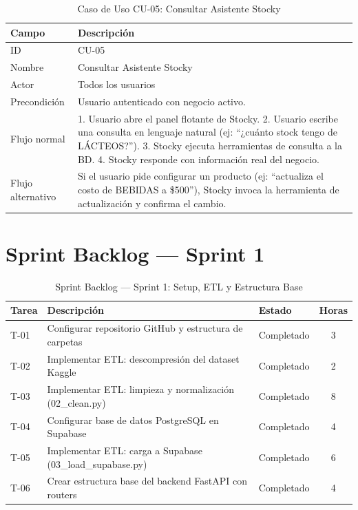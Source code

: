 \documentclass[12pt, a4paper]{report}
\begin{document}
\begin{table}[H]
  \centering
  \caption{Caso de Uso CU-05: Consultar Asistente Stocky}
  \label{tab:cu05}
  \begin{tabular}{|l|p{9cm}|}
    \hline
    \textbf{Campo} & \textbf{Descripción} \\
    \hline
    ID            & CU-05 \\
    Nombre        & Consultar Asistente Stocky \\
    Actor         & Todos los usuarios \\
    Precondición  & Usuario autenticado con negocio activo. \\
    Flujo normal  & 1. Usuario abre el panel flotante de Stocky. 2. Usuario escribe
                    una consulta en lenguaje natural (ej: ``¿cuánto stock tengo de
                    LÁCTEOS?''). 3. Stocky ejecuta herramientas de consulta a la BD.
                    4. Stocky responde con información real del negocio. \\
    Flujo alternativo & Si el usuario pide configurar un producto (ej: ``actualiza
                        el costo de BEBIDAS a \$500''), Stocky invoca la herramienta
                        de actualización y confirma el cambio. \\
    \hline
  \end{tabular}
\end{table}

\section{Sprint Backlog — Sprint 1}

\begin{table}[H]
  \centering
  \caption{Sprint Backlog — Sprint 1: Setup, ETL y Estructura Base}
  \label{tab:sprint1}
  \begin{tabular}{|l|p{6cm}|l|c|}
    \hline
    \textbf{Tarea} & \textbf{Descripción} & \textbf{Estado} & \textbf{Horas} \\
    \hline
    T-01 & Configurar repositorio GitHub y estructura de carpetas    & Completado & 3 \\
    T-02 & Implementar ETL: descompresión del dataset Kaggle         & Completado & 2 \\
    T-03 & Implementar ETL: limpieza y normalización (02\_clean.py)  & Completado & 8 \\
    T-04 & Configurar base de datos PostgreSQL en Supabase           & Completado & 4 \\
    T-05 & Implementar ETL: carga a Supabase (03\_load\_supabase.py) & Completado & 6 \\
    T-06 & Crear estructura base del backend FastAPI con routers     & Completado & 4 \\
    \hline
  \end{tabular}
\end{table}
\end{document}
